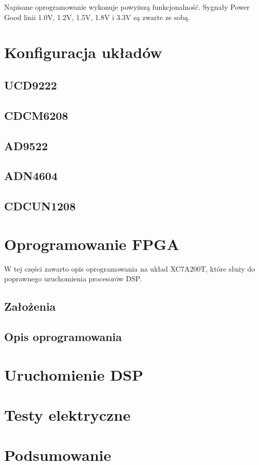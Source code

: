 Napisane oprogramowanie wykonuje powyższą funkcjonalność. Sygnały Power Good linii 1.0V, 1.2V, 1.5V, 1.8V i 3.3V są zwarte ze sobą. 


\section{Konfiguracja układów}

\subsection{UCD9222}
\subsection{CDCM6208}
\subsection{AD9522}
\subsection{ADN4604}
\subsection{CDCUN1208}

\section{Oprogramowanie FPGA}
W tej części zawarto opis oprogramowania na układ XC7A200T, które służy do poprawnego uruchomienia procesorów DSP.
\subsection{Założenia}
\subsection{Opis oprogramowania}

\section{Uruchomienie DSP}

\section{Testy elektryczne}

\section{Podsumowanie}





